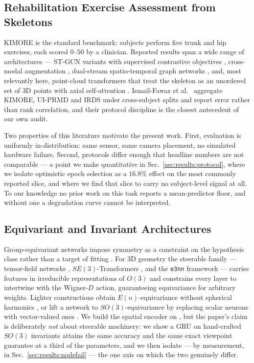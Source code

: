 \documentclass[10pt,journal]{IEEEtran}
\begin{document}
\subsection{Rehabilitation Exercise Assessment from Skeletons}
KIMORE \cite{capecci2019kimore} is the standard benchmark: subjects perform five trunk and hip exercises, each scored $0$--$50$ by a clinician. Reported results span a wide range of architectures --- ST-GCN variants with supervised contrastive objectives \cite{karlov2024}, cross-modal augmentation \cite{abedi2023}, dual-stream spatio-temporal graph networks \cite{kuang2026}, and, most relevantly here, point-cloud transformers that treat the skeleton as an unordered set of $3$D points with axial self-attention \cite{pct2026}. Ismail-Fawaz et al.\ \cite{rehabpile2026} aggregate KIMORE, UI-PRMD \cite{vakanski2018uiprmd} and IRDS under cross-subject splits and report error rather than rank correlation, and their protocol discipline is the closest antecedent of our own audit.

Two properties of this literature motivate the present work. First, evaluation is uniformly in-distribution: same sensor, same camera placement, no simulated hardware failure. Second, protocols differ enough that headline numbers are not comparable --- a point we make quantitative in Sec.~\ref{sec:results:protocol}, where we isolate optimistic epoch selection as a $16.8\%$ effect on the most commonly reported slice, and where we find that slice to carry no subject-level signal at all. To our knowledge no prior work on this task reports a mean-predictor floor, and without one a degradation curve cannot be interpreted.

\subsection{Equivariant and Invariant Architectures}
Group-equivariant networks impose symmetry as a constraint on the hypothesis class rather than a target of fitting \cite{cohen2016gconv}. For $3$D geometry the steerable family --- tensor-field networks \cite{thomas2018tfn}, $SE(3)$-Transformers \cite{fuchs2020se3transformer}, and the \texttt{e3nn} framework \cite{geiger2022e3nn} --- carries features in irreducible representations of $O(3)$ and constrains every layer to intertwine with the Wigner-$D$ action, guaranteeing equivariance for arbitrary weights. Lighter constructions obtain $E(n)$-equivariance without spherical harmonics \cite{satorras2021egnn}, or lift a network to $SO(3)$-equivariance by replacing scalar neurons with vector-valued ones \cite{deng2021vectorneurons}. We build the spatial encoder on \cite{geiger2022e3nn}, but the paper's claim is deliberately \emph{not} about steerable machinery: we show a GRU on hand-crafted $SO(3)$ invariants attains the same accuracy and the same exact viewpoint guarantee at a third of the parameters, and we then isolate --- by measurement, in Sec.~\ref{sec:results:nodefail} --- the one axis on which the two genuinely differ.
\end{document}
